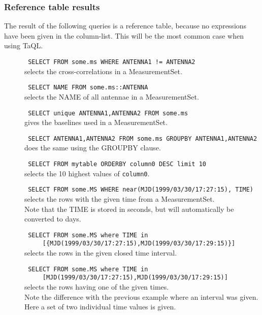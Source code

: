 \subsubsection{Reference table results}
The result of the following queries is a reference table, because no
expressions have been given in the column-list. This will be the most
common case when using TaQL.
\begin{description}
  \item[] \texttt{ SELECT FROM some.ms WHERE ANTENNA1 != ANTENNA2 }
    \\selects the cross-correlations in a MeasurementSet.

  \item[] \texttt{ SELECT NAME FROM some.ms::ANTENNA }
    \\selects the NAME of all antennae in a MeasurementSet.

  \item[] \texttt{ SELECT unique ANTENNA1,ANTENNA2 FROM some.ms }
    \\gives the baselines used in a MeasurementSet.

  \item[] \texttt{ SELECT ANTENNA1,ANTENNA2 FROM some.ms GROUPBY ANTENNA1,ANTENNA2}
    \\does the same using the GROUPBY clause.

  \item[] \texttt{ SELECT FROM mytable ORDERBY column0 DESC limit 10 }
    \\selects the 10 highest values of \texttt{column0}.

  \item[] \texttt{ SELECT FROM some.MS WHERE
      near(MJD(1999/03/30/17:27:15), TIME) }
    \\selects the rows with the given time from a MeasurementSet.
    \\Note that the TIME is stored in seconds, but will automatically
	be converted to days.

   \item[] \texttt{ SELECT FROM some.MS where TIME in }
     \\\verb=    =
     \texttt{ [\{MJD(1999/03/30/17:27:15),MJD(1999/03/30/17:29:15)\}] }
     \\selects the rows in the given closed time interval.

   \item[] \texttt{ SELECT FROM some.MS where TIME in }
     \\\verb=    =
     \texttt{ [MJD(1999/03/30/17:27:15),MJD(1999/03/30/17:29:15)] }
     \\selects the rows having one of the given times.
     \\Note the difference with the previous example where an interval
     was given. Here a set of two individual time values is given.


\end{description}
